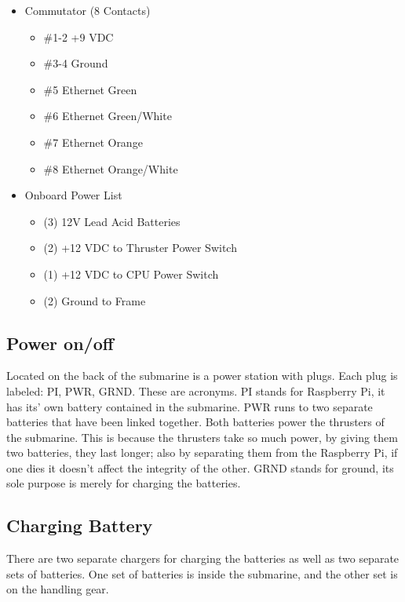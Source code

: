 \documentclass[
18pt, %
a4paper, %
oneside, %
headinclude,footinclude, %
]{scrartcl}
\begin{document}
\begin{itemize}[noitemsep]
\begin{itemize}[noitemsep]
	\end{itemize}
	\item Commutator (8 Contacts)
		\begin{itemize}[noitemsep]
		\item \#1-2 +9 VDC
		\item \#3-4 Ground
		\item \#5 Ethernet Green
		\item \#6 Ethernet Green/White
		\item \#7 Ethernet Orange
		\item \#8 Ethernet Orange/White
	\end{itemize}
	\item Onboard Power List
		\begin{itemize}[noitemsep]
		\item (3) 12V Lead Acid Batteries
		\item (2) +12 VDC to Thruster Power Switch
		\item (1) +12 VDC to CPU Power Switch
		\item (2) Ground to Frame
	\end{itemize}
	
\end{itemize}


\subsection{Power on/off}

Located on the back of the submarine is a power station with plugs. Each plug is labeled: PI, PWR, GRND. These are acronyms. PI stands for Raspberry Pi, it has its' own battery contained in the submarine. PWR runs to two separate batteries that have been linked together. Both batteries power the thrusters of the submarine. This is because the thrusters take so much power, by giving them two batteries, they last longer; also by separating them from the Raspberry Pi, if one dies it doesn't affect the integrity of the other. GRND stands for ground, its sole purpose is merely for charging the batteries.


\subsection{Charging Battery}

There are two separate chargers for charging the batteries as well as two separate sets of batteries. One set of batteries is inside the submarine, and the other set is on the handling gear.
\end{document}
